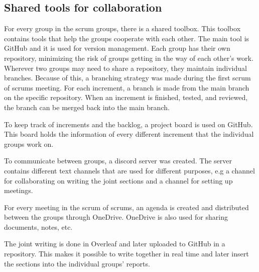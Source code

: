 \subsection{Shared tools for collaboration}\label{sub:shared-tools-for-collaboration}
For every group in the scrum groups, there is a shared toolbox.
This toolbox contains tools that help the groups cooperate with each other.
The main tool is GitHub and it is used for version management.  
Each group has their own repository, minimizing the risk of groups getting in the way of each other's work.
Wherever two groups may need to share a repository, they maintain individual branches.
Because of this, a branching strategy was made during the first scrum of scrums meeting.
For each increment, a branch is made from the main branch on the specific repository. 
When an increment is finished, tested, and reviewed, the branch can be merged back into the main branch.

To keep track of increments and the backlog, a project board is used on GitHub.
This board holds the information of every different increment that the individual groups work on.

To communicate between groups, a discord server was created.
The server contains different text channels that are used for different purposes, e.g a channel for collaborating on writing the joint sections and a channel for setting up meetings.

For every meeting in the scrum of scrums, an agenda is created and distributed between the groups through OneDrive.
OneDrive is also used for sharing documents, notes, etc.

The joint writing is done in Overleaf and later uploaded to GitHub in a repository.
This makes it possible to write together in real time and later insert the sections into the individual groups' reports.
